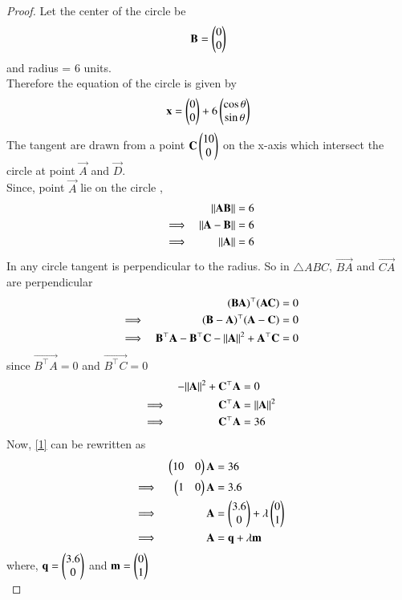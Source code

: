 \documentclass[journal,12pt,twocolumn]{IEEEtran}
\begin{document}
\begin{enumerate}
\begin{proof}
Let the center of the circle be 
\begin{align}
    \mathbf{B} = \begin{pmatrix}0 \\ 0\end{pmatrix}
\end{align}
and radius = 6 units.\\
Therefore the equation of the circle is given by
\begin{align}
    \mathbf{x} = \begin{pmatrix}0 \\ 0\end{pmatrix} + 6\begin{pmatrix}\cos \theta \\ \sin\theta\end{pmatrix}
\end{align}
The tangent are drawn from a point $\mathbf{C} \begin{pmatrix}10 \\ 0\end{pmatrix}$ on the x-axis which intersect the circle at point $\vec{A}$ and $\vec{D}$.\\
Since, point $\vec{A}$ lie on the circle ,
\begin{align}
    &&\lVert\mathbf{AB}\rVert =6\\
    &\implies& \lVert\mathbf{A-B}\rVert=6\\
    &\implies& \lVert\mathbf{A}\rVert=6
\end{align}
In any circle tangent is perpendicular to the radius.
So in $\triangle ABC$, $\vec{BA}$ and $\vec{CA}$ are perpendicular
\begin{align}
    &&\mathbf{(BA)}^\top \mathbf{(AC)} &= 0\\
    &\implies& \mathbf{(B-A)}^\top \mathbf{(A-C)} &= 0\\
    &\implies& \mathbf{B^\top A} - \mathbf{B^\top C} - \lVert\mathbf{A}\rVert^2 + \mathbf{A^\top C} &= 0
\end{align}
since $\vec{B^\top A}=0$ and $\vec{B^\top C}=0$
\begin{align}
    && - \lVert\mathbf{A}\rVert^2 + \mathbf{C^\top A} &= 0\\
    &\implies& \mathbf{C^\top A} &= \lVert\mathbf{A}\rVert^2\\
    &\implies& \mathbf{C^\top A} &= 36 \label{1}
\end{align}
Now, \eqref{1} can be rewritten as
\begin{align}
&&\begin{pmatrix}10 & 0\end{pmatrix}\mathbf{A} &= 36\\
&\implies& \begin{pmatrix}1 & 0\end{pmatrix}\mathbf{A} &= 3.6\\
&\implies& \mathbf{A} &= \begin{pmatrix}3.6 \\ 0\end{pmatrix} + \lambda \begin{pmatrix}0 \\ 1\end{pmatrix}\\
&\implies& \mathbf{A} &= \mathbf{q} + \lambda \mathbf{m}
\end{align}
where, $\mathbf{q} = \begin{pmatrix}3.6 \\ 0\end{pmatrix}$ and $\mathbf{m} = \begin{pmatrix}0 \\ 1\end{pmatrix}$\\

\end{proof}
\end{enumerate}
\end{document}
